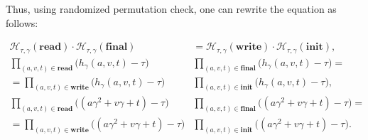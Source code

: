 \documentclass[../lecture-notes-148x210.tex]{subfiles}
\begin{document}
Thus, using randomized permutation check, one can rewrite the equation as follows:
\begin{small}
\begin{align*}
    \mathcal{H}_{\tau,\gamma}(\mathbf{read}) \cdot \mathcal{H}_{\tau,\gamma}(\mathbf{final})& = 
    \mathcal{H}_{\tau,\gamma}(\mathbf{write}) \cdot \mathcal{H}_{\tau,\gamma}(\mathbf{init}),\\
    \prod_{(a,v,t)\in \mathbf{read}}\bigl(h_{\gamma}(a,v,t)-\tau\bigr) &\prod_{(a,v,t)\in \mathbf{final}}\bigl(h_{\gamma}(a,v,t)-\tau\bigr) = \\
    = \prod_{(a,v,t)\in \mathbf{write}}\bigl(h_{\gamma}(a,v,t)-\tau\bigr)& \prod_{(a,v,t)\in \mathbf{init}}\bigl(h_{\gamma}(a,v,t)-\tau\bigr), \\
    \prod_{(a,v,t)\in \mathbf{read}}\bigl((a\gamma^2+v\gamma+t)-\tau\bigr) &\prod_{(a,v,t)\in \mathbf{final}}\bigl((a\gamma^2+v\gamma+t)-\tau\bigr) = \\
    = \prod_{(a,v,t)\in \mathbf{write}}\bigl((a\gamma^2+v\gamma+t)-\tau\bigr)& \prod_{(a,v,t)\in \mathbf{init}}\bigl((a\gamma^2+v\gamma+t)-\tau\bigr).
\end{align*}
\end{small}
\end{document}
